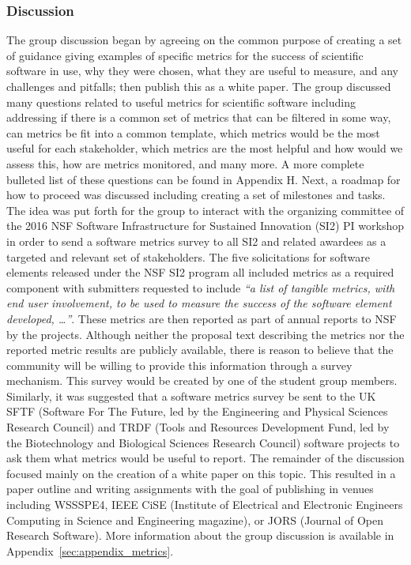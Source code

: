 \subsubsection{Discussion}

The group discussion began by agreeing on the common purpose of creating a set
of guidance giving examples of specific metrics for the success of scientific
software in use, why they were chosen, what they are useful to measure, and any
challenges and pitfalls; then publish this as a white paper. The group discussed
many questions related to useful metrics for scientific software including
addressing if there is a common set of metrics that can be filtered in some way,
can metrics be fit into a common template, which metrics would be the most
useful for each stakeholder, which metrics are the most helpful and how would we
assess this, how are metrics monitored, and many more. A more complete bulleted
list of these questions can be found in Appendix H. Next, a roadmap for how to
proceed was discussed including creating a set of milestones and tasks. The idea
was put forth for the group to interact with the organizing committee of the
2016 NSF Software Infrastructure for Sustained Innovation (SI2) PI workshop in
order to send a software metrics survey to all SI2 and related awardees as a
targeted and relevant set of stakeholders. The five solicitations for software
elements released under the NSF SI2 program all included metrics as a required
component with submitters requested to include {\it ``a list of tangible
metrics, with end user involvement, to be used to measure the success of the
software element developed, \dots''}. These metrics are then reported as part of
annual reports to NSF by the projects. Although neither the proposal text
describing the metrics nor the reported metric results are publicly available,
there is reason to believe that the community will be willing to provide this
information through a survey mechanism. This survey would be created by one of
the student group members. Similarly, it was suggested that a software metrics
survey be sent to the UK SFTF (Software For The Future, led by the Engineering
and Physical Sciences Research Council) and TRDF (Tools and Resources
Development Fund, led by the Biotechnology and Biological Sciences Research
Council) software projects to ask them what metrics would be useful to report.
The remainder of the discussion focused mainly on the creation of a white paper
on this topic. This resulted in a paper outline and writing assignments with the
goal of publishing in venues including WSSSPE4, IEEE CiSE (Institute of
Electrical and Electronic Engineers Computing in Science and Engineering
magazine), or JORS (Journal of Open Research Software). More information about
the group discussion is available in Appendix~\ref{sec:appendix_metrics}.

